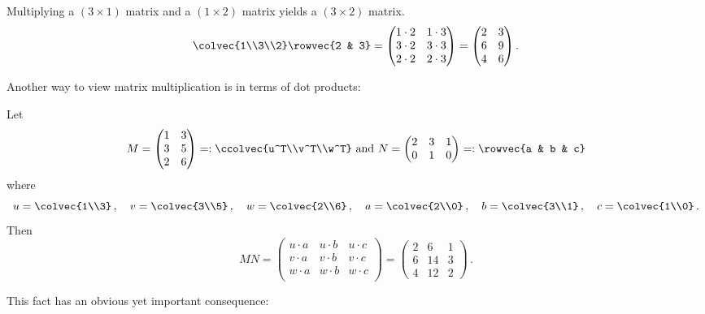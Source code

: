 

\begin{example}
Multiplying a $(3\times 1)$ matrix and a $(1\times 2)$ matrix yields a $(3\times 2)$ matrix.
\[
\colvec{1\\3\\2} \rowvec{2 & 3} = 
\begin{pmatrix}
1\cdot 2 & 1\cdot 3 \\
3\cdot 2 & 3\cdot 3 \\
2\cdot 2 & 2\cdot 3 \\
\end{pmatrix}
= \begin{pmatrix}
2 & 3 \\
6 & 9 \\
4 & 6 
\end{pmatrix} .
\]
\end{example}

Another way to view matrix multiplication is in terms of dot products:

\begin{center}
\end{center}


\begin{example}
Let \[M=\begin{pmatrix}1&3\\3&5\\2&6\end{pmatrix}=:\ccolvec{u^T\\v^T\\w^T}
\mbox{ and }
N=\begin{pmatrix}2&3&1\\0&1&0\end{pmatrix}=:\rowvec{a & b & c}\]
where
\[
u=\colvec{1\\3}\, ,\quad
v=\colvec{3\\5}\, ,\quad 
w=\colvec{2\\6}\, ,\quad
a=\colvec{2\\0}\, ,\quad
b=\colvec{3\\1}\, ,\quad 
c=\colvec{1\\0}\, .
\]
Then 
\[
MN=\left(\!\begin{array}{ccc}
u\cdot a & u\cdot b & u\cdot c\\
v\cdot a & v\cdot b & v\cdot c\\
w\cdot a & w\cdot b & w\cdot c\\ 
\end{array}\!\right)
=
\begin{pmatrix}
2&6&1\\
6&14&3\\
4&12&2
\end{pmatrix}\, .
\]
\end{example}
This fact has an obvious yet important consequence:


